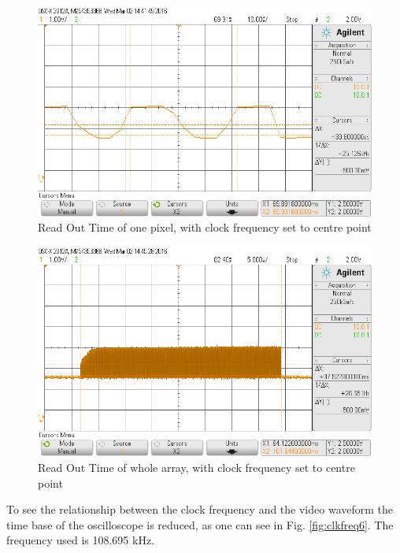\begin{figure}[H]
\begin{center}
\includegraphics[scale=0.4]{LabFour/scope_61}
\end{center}
\caption{Read Out Time of one pixel, with clock frequency set to centre point}
\label{fig:clkfreq4}
\end{figure}
\begin{figure}[H]
\begin{center}
\includegraphics[scale=0.4]{LabFour/scope_62}
\end{center}
\caption{Read Out Time of whole array, with clock frequency set to centre point}
\label{fig:clkfreq5}
\end{figure}

To see the relationship between the clock frequency and the video waveform the time base of the oscilloscope is reduced, as one can see in Fig. \ref{fig:clkfreq6}. The frequency used is 108.695 kHz.

